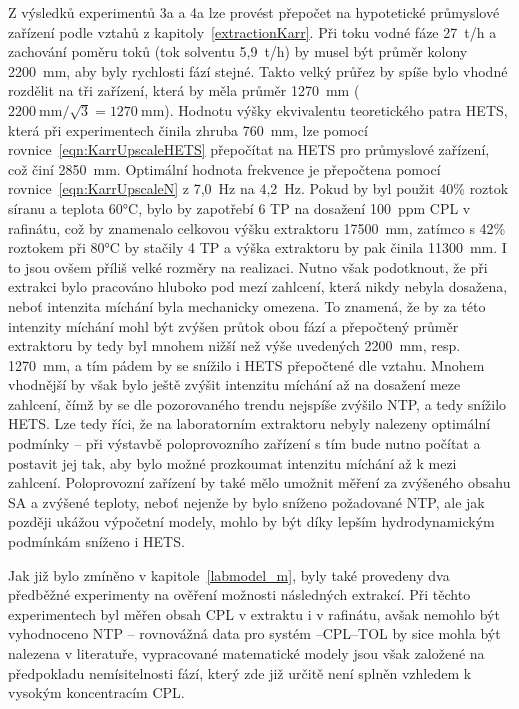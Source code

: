 Z výsledků experimentů 3a a 4a lze provést přepočet na hypotetické průmyslové zařízení podle vztahů z kapitoly~\ref{extractionKarr}.
Při toku vodné fáze 27~t/h a zachování poměru toků (tok solventu 5,9~t/h) by musel být průměr kolony 2200~mm, aby byly rychlosti fází stejné.
Takto velký průřez by spíše bylo vhodné rozdělit na tři zařízení, která by měla průměr 1270~mm ($2200~\mathrm{mm} / \sqrt{3} = 1270~\mathrm{mm}$).
Hodnotu výšky ekvivalentu teoretického patra HETS, která při experimentech činila zhruba 760~mm, lze pomocí rovnice~\ref{eqn:KarrUpscaleHETS} přepočítat na HETS pro průmyslové zařízení, což činí 2850~mm.
Optimální hodnota frekvence je přepočtena pomocí rovnice~\ref{eqn:KarrUpscaleN} z 7,0~Hz na 4,2~Hz.
Pokud by byl použit 40\% roztok síranu a teplota 60°C, bylo by zapotřebí 6 TP na dosažení 100~ppm CPL v rafinátu, což by znamenalo celkovou výšku extraktoru 17500~mm, zatímco s 42\% roztokem při 80°C by stačily 4 TP a výška extraktoru by pak činila 11300~mm.
I to jsou ovšem příliš velké rozměry na realizaci.
Nutno však podotknout, že při extrakci bylo pracováno hluboko pod mezí zahlcení, která nikdy nebyla dosažena, neboť intenzita míchání byla mechanicky omezena.
To znamená, že by za této intenzity míchání mohl být zvýšen průtok obou fází a přepočtený průměr extraktoru by tedy byl mnohem nižší než výše uvedených 2200~mm, resp. 1270~mm, a tím pádem by se snížilo i HETS přepočtené dle vztahu.
Mnohem vhodnější by však bylo ještě zvýšit intenzitu míchání až na dosažení meze zahlcení, čímž by se dle pozorovaného trendu nejspíše zvýšilo NTP, a tedy snížilo HETS.
Lze tedy říci, že na laboratorním extraktoru nebyly nalezeny optimální podmínky -- při výstavbě poloprovozního zařízení s tím bude nutno počítat a postavit jej tak, aby bylo možné prozkoumat intenzitu míchání až k mezi zahlcení.
Poloprovozní zařízení by také mělo umožnit měření za zvýšeného obsahu SA a zvýšené teploty, neboť nejenže by bylo sníženo požadované NTP, ale jak později ukážou výpočetní modely, mohlo by být díky lepším hydrodynamickým podmínkám sníženo i HETS.

Jak již bylo zmíněno v kapitole~\ref{labmodel_m}, byly také provedeny dva předběžné experimenty na ověření možnosti následných extrakcí.
Při těchto experimentech byl měřen obsah CPL v extraktu i v rafinátu, avšak nemohlo být vyhodnoceno NTP -- rovnovážná data pro systém --CPL--TOL by sice mohla být nalezena v literatuře, vypracované matematické modely jsou však založené na předpokladu nemísitelnosti fází, který zde již určitě není splněn vzhledem k vysokým koncentracím CPL.

